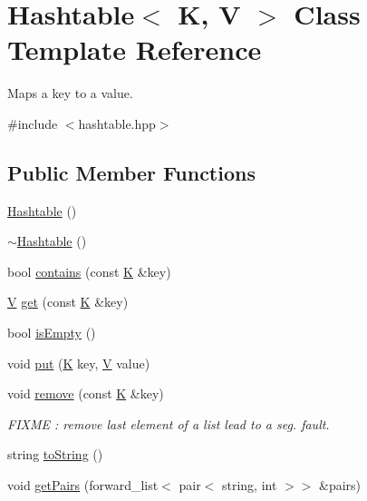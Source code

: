 \hypertarget{class_hashtable}{\section{Hashtable$<$ K, V $>$ Class Template Reference}
\label{class_hashtable}
}


Maps a key to a value.  




{\ttfamily \#include $<$hashtable.\-hpp$>$}

\subsection*{Public Member Functions}
\begin{DoxyCompactItemize}
\item 
\hyperlink{class_hashtable_a2f77d0c6d61286bf8d66552b5ade3f27}{Hashtable} ()
\item 
\hyperlink{class_hashtable_a3f4057afda4ad0f6b805f900e43b53f6}{$\sim$\-Hashtable} ()
\item 
bool \hyperlink{class_hashtable_a7521d8ed5476dcfef5ea1079f98acb7b}{contains} (const \hyperlink{sample__hashtable_8cpp_a97d832ae23af4f215e801e37e4f94254}{K} \&key)
\item 
\hyperlink{sample__hashtable_8cpp_af40a326b23c68a27cebe60f16634a2cb}{V} \hyperlink{class_hashtable_a06702992ba59e62b443e1c2d380625dc}{get} (const \hyperlink{sample__hashtable_8cpp_a97d832ae23af4f215e801e37e4f94254}{K} \&key)
\item 
bool \hyperlink{class_hashtable_a779816cba88876b2547600f930b293db}{is\-Empty} ()
\item 
void \hyperlink{class_hashtable_af6f9a4e3d5c74f0d5d5f966eece2fc2b}{put} (\hyperlink{sample__hashtable_8cpp_a97d832ae23af4f215e801e37e4f94254}{K} key, \hyperlink{sample__hashtable_8cpp_af40a326b23c68a27cebe60f16634a2cb}{V} value)
\item 
void \hyperlink{class_hashtable_a5ff7eaa859387421be734f9573dc0ebe}{remove} (const \hyperlink{sample__hashtable_8cpp_a97d832ae23af4f215e801e37e4f94254}{K} \&key)
\begin{DoxyCompactList}\small\item\em F\-I\-X\-M\-E \-: remove last element of a list lead to a seg. fault. \end{DoxyCompactList}\item 
string \hyperlink{class_hashtable_ad3141029cd09f8e5e2026af5156c1e0e}{to\-String} ()
\item 
void \hyperlink{class_hashtable_a75e0588845c907821b884af8a0afe1b7}{get\-Pairs} (forward\-\_\-list$<$ pair$<$ string, int $>$$>$ \&pairs)
\end{DoxyCompactItemize}
